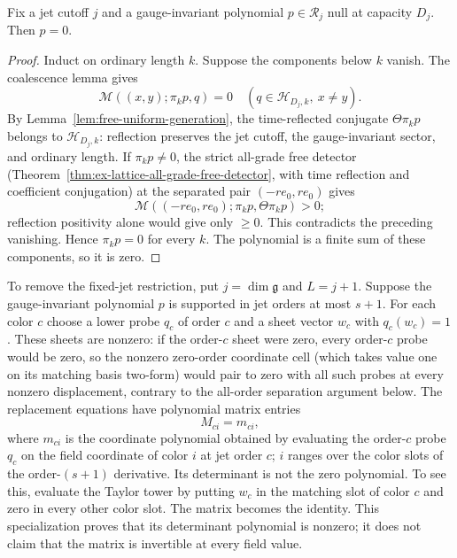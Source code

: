 \begin{lemma}
\label{lem:free-shell-reduction}
Fix a jet cutoff $j$ and a gauge-invariant polynomial
$p\in\mathcal R_j$ null at capacity $D_j$.  Then $p=0$.
\end{lemma}

\begin{proof}
Induct on ordinary length $k$.  Suppose the components below $k$ vanish.
The coalescence lemma gives
\[
 \mathcal M((x,y);\pi_kp,q)=0
 \quad(q\in\mathcal H_{D_j,k},\ x\ne y).
\]
By Lemma~\ref{lem:free-uniform-generation}, the time-reflected conjugate
$\Theta\pi_kp$ belongs to $\mathcal H_{D_j,k}$: reflection preserves
the jet cutoff, the gauge-invariant sector, and ordinary length.  If
$\pi_kp\ne0$, the strict all-grade free detector
(Theorem~\ref{thm:ex-lattice-all-grade-free-detector}, with time
reflection and coefficient conjugation) at the separated pair
$(-r e_0,r e_0)$ gives
\[
 \mathcal M((-r e_0,r e_0);\pi_kp,\Theta\pi_kp)>0;
\]
reflection positivity alone would give only $\ge0$. This contradicts
the preceding vanishing.  Hence $\pi_kp=0$ for every $k$.
The polynomial is a finite sum of these components, so it is zero.
\end{proof}

To remove the fixed-jet restriction, put $j=\dim\mathfrak g$ and
$L=j+1$.  Suppose the gauge-invariant polynomial $p$ is supported in jet
orders at most $s+1$.  For each color $c$ choose a lower probe $q_c$ of
order $c$ and a sheet vector $w_c$ with $q_c(w_c)=1$.  These sheets are
nonzero: if the order-$c$ sheet were zero, every order-$c$ probe would be
zero, so the nonzero zero-order coordinate cell (which takes value one on
its matching basis two-form) would pair to zero with all such probes at
every nonzero displacement, contrary to the all-order separation argument
below.  The replacement equations have polynomial
matrix entries
\[
 M_{ci}=m_{ci},
\]
where $m_{ci}$ is the coordinate polynomial obtained by evaluating the
order-$c$ probe $q_c$ on the field coordinate of color $i$ at jet order
$c$; $i$ ranges over the color slots of the order-$(s+1)$ derivative.  Its
determinant is not the zero polynomial.  To see this, evaluate the Taylor
tower by putting $w_c$ in the matching slot of color $c$ and zero in every
other color slot.  The matrix becomes the identity.  This specialization
proves that its determinant polynomial is nonzero; it does not claim that
the matrix is invertible at every field value.

